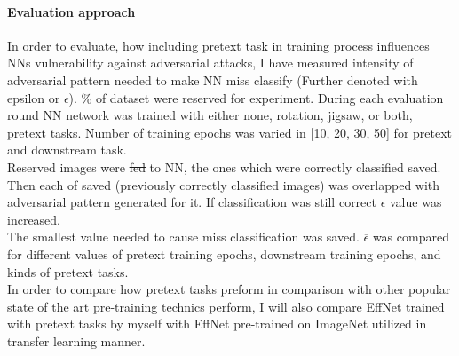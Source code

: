 \paragraph{Evaluation approach}
In order to evaluate, how including pretext task in training process influences NNs vulnerability against adversarial attacks,
I have measured intensity of adversarial pattern needed to make NN miss classify (Further denoted with epsilon or $\epsilon$).
\% of dataset were reserved for experiment.
During each evaluation round NN network was trained with either none, rotation, jigsaw, or both, pretext tasks.
Number of training epochs was varied in [10, 20, 30, 50] for pretext and downstream task.
\\
Reserved images were \st{fed} to NN, the ones which were correctly classified saved.
Then each of saved (previously correctly classified images) was overlapped with adversarial pattern generated for it.
If classification was still correct $\epsilon$ value was increased.
\\
The smallest value needed to cause miss classification was saved.
$\overline{\epsilon}$ was compared for different values of pretext training epochs, downstream training epochs,
and kinds of pretext tasks.
\\
In order to compare how pretext tasks preform in comparison with other popular state of the art pre-training technics perform,
I will also compare EffNet trained with pretext tasks by myself with EffNet pre-trained on ImageNet utilized in transfer learning manner.